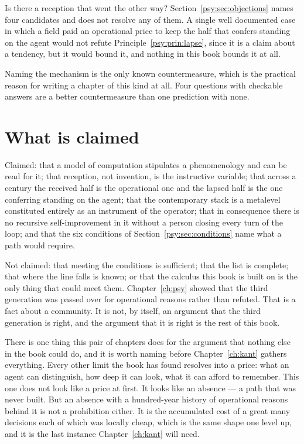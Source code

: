 \begin{question}
\label{psy:q:counterexample}
Is there a reception that went the other way?
Section~\ref{psy:sec:objections} names four candidates and does not
resolve any of them.
A single well documented case in which a field paid an operational
price to keep the half that confers standing on the agent would not
refute Principle~\ref{psy:prin:lapse}, since it is a claim about a
tendency, but it would bound it, and nothing in this book bounds it
at all.
\end{question}

Naming the mechanism is the only known countermeasure, which is the
practical reason for writing a chapter of this kind at all.
Four questions with checkable answers are a better countermeasure
than one prediction with none.

\section{What is claimed}
\label{psy:sec:psy-claims}

Claimed: that a model of computation stipulates a phenomenology and
can be read for it; that reception, not invention, is the
instructive variable; that across a century the received half is the
operational one and the lapsed half is the one conferring standing
on the agent; that the contemporary stack is a metalevel constituted
entirely as an instrument of the operator; that in consequence there
is no recursive self-improvement in it without a person closing
every turn of the loop; and that the six conditions of
Section~\ref{psy:sec:conditions} name what a path would require.

Not claimed: that meeting the conditions is sufficient; that the
list is complete; that where the line falls is known; or that the
calculus this book is built on is the only thing that could meet
them.
Chapter~\ref{ch:psy} showed that the third generation was passed
over for operational reasons rather than refuted.
That is a fact about a community.
It is not, by itself, an argument that the third generation is
right, and the argument that it is right is the rest of this book.

There is one thing this pair of chapters does for the argument that
nothing else in the book could do, and it is worth naming before
Chapter~\ref{ch:kant} gathers everything.
Every other limit the book has found resolves into a price: what an
agent can distinguish, how deep it can look, what it can afford to
remember.
This one does not look like a price at first.
It looks like an absence --- a path that was never built.
But an absence with a hundred-year history of operational reasons
behind it is not a prohibition either.
It is the accumulated cost of a great many decisions each of which
was locally cheap, which is the same shape one level up, and it is
the last instance Chapter~\ref{ch:kant} will need.
